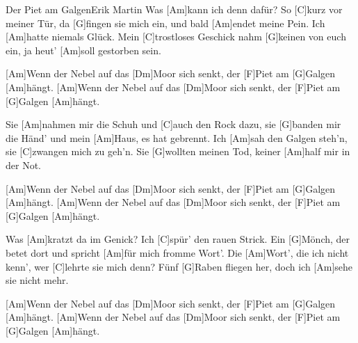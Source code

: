 \documentclass[../main.tex]{subfiles}
\begin{document}
\begin{song}{Der Piet am Galgen}{Erik Martin}{}       
Was [Am]kann ich denn dafür? So [C]kurz vor meiner Tür,
da [G]fingen sie mich ein, und bald [Am]endet meine Pein.
Ich [Am]hatte niemals Glück. Mein [C]trostloses Geschick
nahm [G]keinen von euch ein, ja heut' [Am]soll gestorben sein.

[Am]Wenn der Nebel auf das [Dm]Moor sich senkt,
der [F]Piet am [G]Galgen [Am]hängt.
[Am]Wenn der Nebel auf das [Dm]Moor sich senkt,
der [F]Piet am [G]Galgen [Am]hängt.

Sie [Am]nahmen mir die Schuh und [C]auch den Rock dazu,
sie [G]banden mir die Händ' und mein [Am]Haus, es hat gebrennt.
Ich [Am]sah den Galgen steh'n, sie [C]zwangen mich zu geh'n.
Sie [G]wollten meinen Tod, keiner [Am]half mir in der Not.

[Am]Wenn der Nebel auf das [Dm]Moor sich senkt,
der [F]Piet am [G]Galgen [Am]hängt.
[Am]Wenn der Nebel auf das [Dm]Moor sich senkt,
der [F]Piet am [G]Galgen [Am]hängt.

Was [Am]kratzt da im Genick? Ich [C]spür' den rauen Strick.
Ein [G]Mönch, der betet dort und spricht [Am]für mich fromme Wort'.
Die [Am]Wort', die ich nicht kenn', wer [C]lehrte sie mich denn?
Fünf [G]Raben fliegen her, doch ich [Am]sehe sie nicht mehr.

[Am]Wenn der Nebel auf das [Dm]Moor sich senkt,
der [F]Piet am [G]Galgen [Am]hängt.
[Am]Wenn der Nebel auf das [Dm]Moor sich senkt,
der [F]Piet am [G]Galgen [Am]hängt.
\end{song}
\end{document}
